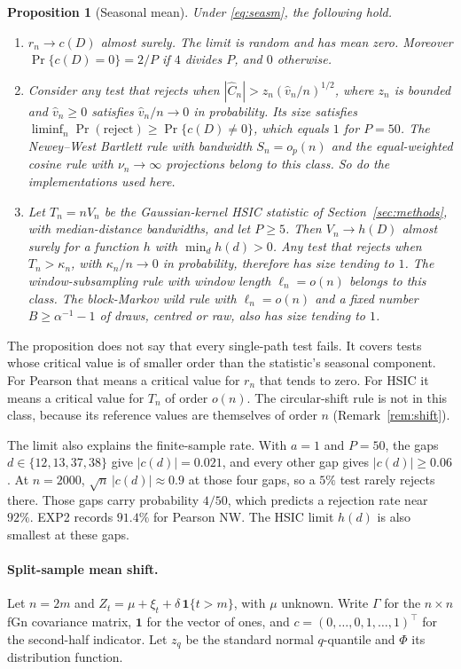 \documentclass[11pt]{article}
\newtheorem{proposition}{Proposition}
\theoremstyle{remark}
\newcommand{\one}{\mathbf 1}
\begin{document}
\begin{proposition}[Seasonal mean]\label{prop:seasm}
Under \eqref{eq:seasm}, the following hold.
\begin{enumerate}[label=(\roman*),nosep]
\item $r_n\to c(D)$ almost surely. The limit is random and has mean zero. Moreover $\Pr\{c(D)=0\}=2/P$ if $4$ divides $P$, and $0$ otherwise.
\item Consider any test that rejects when $|\hat C_n|>z_n(\hat v_n/n)^{1/2}$, where $z_n$ is bounded and $\hat v_n\ge0$ satisfies $\hat v_n/n\to0$ in probability. Its size satisfies $\liminf_n\Pr(\text{reject})\ge\Pr\{c(D)\neq0\}$, which equals $1$ for $P=50$. The Newey--West Bartlett rule with bandwidth $S_n=o_p(n)$ and the equal-weighted cosine rule with $\nu_n\to\infty$ projections belong to this class. So do the implementations used here.
\item Let $T_n=nV_n$ be the Gaussian-kernel HSIC statistic of Section~\ref{sec:methods}, with median-distance bandwidths, and let $P\ge5$. Then $V_n\to h(D)$ almost surely for a function $h$ with $\min_d h(d)>0$. Any test that rejects when $T_n>\kappa_n$, with $\kappa_n/n\to0$ in probability, therefore has size tending to $1$. The window-subsampling rule with window length $\ell_n=o(n)$ belongs to this class. The block-Markov wild rule with $\ell_n=o(n)$ and a fixed number $B\ge\alpha^{-1}-1$ of draws, centred or raw, also has size tending to $1$.
\end{enumerate}
\end{proposition}

The proposition does not say that every single-path test fails. It covers tests whose critical value is of smaller order than the statistic's seasonal component. For Pearson that means a critical value for $r_n$ that tends to zero. For HSIC it means a critical value for $T_n$ of order $o(n)$. The circular-shift rule is not in this class, because its reference values are themselves of order $n$ (Remark~\ref{rem:shift}).

The limit also explains the finite-sample rate. With $a=1$ and $P=50$, the gaps $d\in\{12,13,37,38\}$ give $|c(d)|=0.021$, and every other gap gives $|c(d)|\ge0.06$. At $n=2000$, $\sqrt n\,|c(d)|\approx0.9$ at those four gaps, so a $5\%$ test rarely rejects there. Those gaps carry probability $4/50$, which predicts a rejection rate near $92\%$. EXP2 records $91.4\%$ for Pearson NW. The HSIC limit $h(d)$ is also smallest at these gaps.

\paragraph{Split-sample mean shift.}
Let $n=2m$ and $Z_t=\mu+\xi_t+\delta\,\one\{t>m\}$, with $\mu$ unknown. Write $\Gamma$ for the $n\times n$ fGn covariance matrix, $\one$ for the vector of ones, and $c=(0,\ldots,0,1,\ldots,1)^\top$ for the second-half indicator. Let $z_q$ be the standard normal $q$-quantile and $\Phi$ its distribution function.
\end{document}
